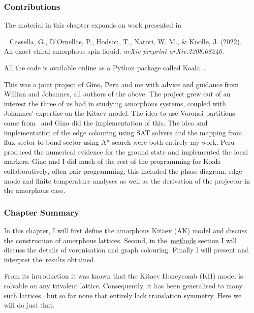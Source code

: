 \hypertarget{ak-contributions}{%
\subsubsection{Contributions}\label{ak-contributions}}

The material in this chapter expands on work presented in

~\autocite{cassellaExactChiralAmorphous2022} Cassella, G., D'Ornellas, P., Hodson, T., Natori, W. M., \& Knolle, J. (2022). An exact chiral amorphous spin liquid. \emph{arXiv preprint arXiv:2208.08246.}

All the code is available online as a Python package called Koala~\autocite{hodsonKoalaKitaevAmorphous2022}.

This was a joint project of Gino, Peru and me with advice and guidance from Willian and Johannes, all authors of the above. The project grew out of an interest the three of us had in studying amorphous systems, coupled with Johannes' expertise on the Kitaev model. The idea to use Voronoi partitions came from~\autocite{marsalTopologicalWeaireThorpe2020} and Gino did the implementation of this. The idea and implementation of the edge colouring using SAT solvers and the mapping from flux sector to bond sector using A* search were both entirely my work. Peru produced the numerical evidence for the ground state and implemented the local markers. Gino and I did much of the rest of the programming for Koala collaboratively, often pair programming, this included the phase diagram, edge mode and finite temperature analyses as well as the derivation of the projector in the amorphous case.

\hypertarget{ak-summary}{%
\subsubsection{Chapter Summary}\label{ak-summary}}

In this chapter, I will first define the amorphous Kitaev (AK) model and discuss the construction of amorphous lattices. Second, in the~\protect\hyperlink{amk-methods}{methods} section I will discuss the details of voronisation and graph colouring. Finally I will present and interpret the~\protect\hyperlink{amk-results}{results} obtained.

From its introduction it was known that the Kitaev Honeycomb (KH) model is solvable on any trivalent lattice. Consequently, it has been generalised to many such lattices~\autocite{eschmannThermodynamicClassificationThreedimensional2020,Yao2009,eschmann2019thermodynamics,Peri2020} but so far none that entirely lack translation symmetry. Here we will do just that.

